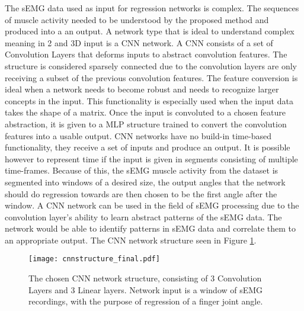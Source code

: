 \documentclass[../main.tex]{subfiles}
\begin{document}
The sEMG data used as input for regression networks is complex.
The sequences of muscle activity needed to be understood by the proposed method and produced into a an output.
A network type that is ideal to understand complex meaning in 2 and 3D input is a CNN network.
A CNN consists of a set of Convolution Layers that deforms inputs to abstract convolution features.
The structure is considered sparsely connected due to the convolution layers are only receiving a subset of the previous convolution features.
The feature conversion is ideal when a network needs to become robust and needs to recognize larger concepts in the input.
This functionality is especially used when the input data takes the shape of a matrix.
Once the input is convoluted to a chosen feature abstraction, it is given to a MLP structure trained to convert the convolution features into a usable output.
CNN networks have no build-in time-based functionality, they receive a set of inputs and produce an output.
It is possible however to represent time if the input is given in segments consisting of multiple time-frames.
Because of this, the sEMG muscle activity from the dataset is segmented into windows of a desired size, the output angles that the network should do regression towards are then chosen to be the first angle after the window.
A CNN network can be used in the field of sEMG processing due to the convolution layer's ability to learn abstract patterns of the sEMG data.
The network would be able to identify patterns in sEMG data and correlate them to an appropriate output.
The CNN network structure seen in Figure \ref{fig:cnn_structure}.

\begin{figure}[H]
\begin{center}
\texttt{[image: cnnstructure\_final.pdf]}
\caption{The chosen CNN network structure, consisting of 3 Convolution Layers and 3 Linear layers. Network input is a window of sEMG recordings, with the purpose of regression of a finger joint angle.}
\label{fig:cnn_structure}
\end{center}
\end{figure}
\end{document}
